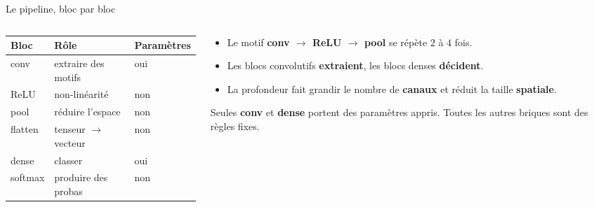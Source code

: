 \begin{frame}{Le pipeline, bloc par bloc}
\begin{columns}[t]
\begin{column}{0.50\textwidth}
\begin{center}
\begin{tabular}{@{}lll@{}}
\toprule
\textbf{Bloc} & \textbf{Rôle} & \textbf{Paramètres} \\
\midrule
conv & extraire des motifs & oui \\
ReLU & non-linéarité & non \\
pool & réduire l'espace & non \\
flatten & tenseur $\to$ vecteur & non \\
dense & classer & oui \\
softmax & produire des probas & non \\
\bottomrule
\end{tabular}
\end{center}
\end{column}
\begin{column}{0.46\textwidth}
\begin{itemize}
  \item Le motif \textbf{conv $\to$ ReLU $\to$ pool} se répète $2$ à $4$ fois.
  \item Les blocs convolutifs \textbf{extraient}, les blocs denses
  \textbf{décident}.
  \item La profondeur fait grandir le nombre de \textbf{canaux} et réduit la
  taille \textbf{spatiale}.
\end{itemize}
\begin{kbox}
Seules \textbf{conv} et \textbf{dense} portent des paramètres appris. Toutes les
autres briques sont des règles fixes.
\end{kbox}
\end{column}
\end{columns}
\end{frame}